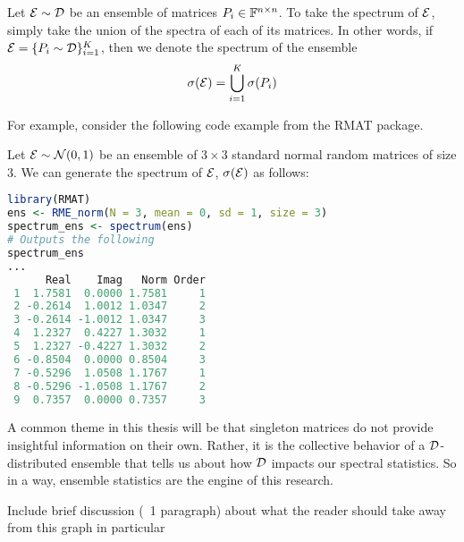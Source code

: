 \begin{definition}
Let $\mathcal{E} \sim \mathcal{D}$ be an ensemble of matrices $P_i \in \mathbb{F}^{n \times n}$. To take the spectrum of $\mathcal{E}$, simply take the union of the spectra of each of its matrices.
In other words, if $\mathcal{E} = \{P_i \sim \mathcal{D}\}_{i = 1}^K$, then we denote the spectrum of the ensemble
$$\sigma(\mathcal{E}) = \bigcup_{i=1}^K \sigma(P_i)$$
\end{definition}

\medskip
\noindent For example, consider the following code example from the RMAT package.
\begin{code}
Let $\mathcal{E} \sim \mathcal{N}(0,1)$ be an ensemble of $3 \times 3$ standard normal random matrices of size $3$. We can generate the spectrum of $\mathcal{E}$, $\sigma(\mathcal{E})$ as follows:
\end{code}

\begin{lstlisting}[language=R]
library(RMAT)
ens <- RME_norm(N = 3, mean = 0, sd = 1, size = 3)
spectrum_ens <- spectrum(ens)
# Outputs the following
spectrum_ens
...
      Real    Imag   Norm Order
 1  1.7581  0.0000 1.7581     1
 2 -0.2614  1.0012 1.0347     2
 3 -0.2614 -1.0012 1.0347     3
 4  1.2327  0.4227 1.3032     1
 5  1.2327 -0.4227 1.3032     2
 6 -0.8504  0.0000 0.8504     3
 7 -0.5296  1.0508 1.1767     1
 8 -0.5296 -1.0508 1.1767     2
 9  0.7357  0.0000 0.7357     3
\end{lstlisting}


A common theme in this thesis will be that singleton matrices do not provide insightful information on their own.
Rather, it is the collective behavior of a $\mathcal{D}$-distributed ensemble that tells us about how $\mathcal{D}$ impacts our spectral statistics.
So in a way, ensemble statistics are the engine of this research.



Include brief discussion (~1 paragraph) about what the reader should take away from this graph in particular

